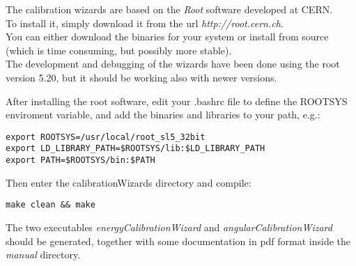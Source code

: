 The calibration wizards are based on the \textit{Root} software developed at CERN.\\
To install it, simply download it from the url \textit{http://root.cern.ch}.\\
You can either download the binaries for your system or install from source (which is time consuming, but possibly more stable).\\
The development and debugging of the wizards have been done using the root version 5.20, but it should be working also with newer versions.

After installing the root software, edit your .bashrc file to define the ROOTSYS enviroment variable, and add the binaries and libraries to your path, e.g.:
\begin{verbatim}
export ROOTSYS=/usr/local/root_sl5_32bit
export LD_LIBRARY_PATH=$ROOTSYS/lib:$LD_LIBRARY_PATH
export PATH=$ROOTSYS/bin:$PATH
\end{verbatim} 

Then enter the calibrationWizards directory and compile:
\begin{verbatim}
make clean && make
\end{verbatim}

The two executables \textit{energyCalibrationWizard} and \textit{angularCalibrationWizard} should be generated, together with some documentation in pdf format inside the \textit{manual} directory.
